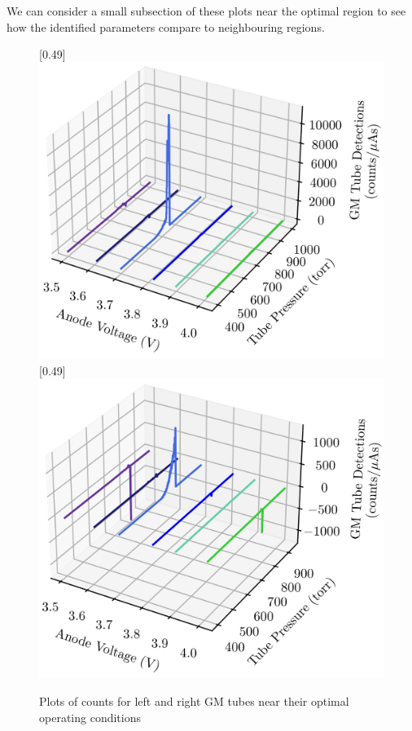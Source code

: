 We can consider a small subsection of these plots near the optimal region to see how the identified parameters compare to neighbouring regions. 

\begin{figure}[h!]
  \centering
  [0.49\linewidth]{\includegraphics[scale=1]{Figs/LGM Waterfall.jpg}}
  [0.49\linewidth]{\includegraphics[scale=1]{Figs/RGM Waterfall.jpg}}
  \caption{Plots of counts for left and right GM tubes near their optimal operating conditions}
  \label{fig:waterfall}
\end{figure}

